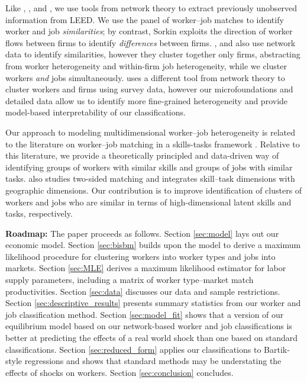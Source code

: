 \documentclass[12pt]{article}
\theoremstyle{definition}
\theoremstyle{plain}
\begin{document}
Like \citet{Sorkin2018}, \citet{Nimczik2018}, and \citet{JaroschNimczikSorkin2019}, we use tools from network theory to extract previously unobserved information from LEED. We use the panel of worker--job matches to identify worker and job \emph{similarities}; by contrast, Sorkin exploits the direction of worker flows between firms to identify \emph{differences} between firms. \citet{Nimczik2018}, and \citet{JaroschNimczikSorkin2019} also use network data to identify similarities, however they cluster together only firms, abstracting from worker heterogeneity and within-firm job heterogeneity, while we cluster workers \emph{and} jobs simultaneously. \citet{Schmutte2014} uses a different tool from network theory to cluster workers and firms using survey data, however our microfoundations and detailed data allow us to identify more fine-grained heterogeneity and provide model-based interpretability of our classifications. 

Our approach to modeling multidimensional worker--job heterogeneity is related to the literature on worker--job matching in a skills-tasks framework \citep{AutorLevyMurnane2003,AcemogluAutor2011,Autor2013,Lindenlaub2017,Tan2018,Kantenga2018}. Relative to this literature, we provide a theoretically principled and data-driven way of identifying groups of workers with similar skills and groups of jobs with similar tasks. \citet{Mansfield2019} also studies two-sided matching and integrates skill--task dimensions with geographic dimensions.  Our contribution is to improve identification of clusters of workers and jobs who are similar in terms of high-dimensional latent skills and tasks, respectively.

\textbf{Roadmap:} The paper proceeds as follows.  Section \ref{sec:model} lays out our economic model. Section \ref{sec:bisbm} builds upon the model to derive a maximum likelihood procedure for clustering workers into worker types and jobs into markets. Section \ref{sec:MLE} derives a maximum likelihood estimator for labor supply parameters, including a matrix of worker type--market match productivities. Section \ref{sec:data} discusses our data and sample restrictions. Section \ref{sec:descriptive_results} presents summary statistics from our worker and job classification method. Section \ref{sec:model_fit} shows that a version of our equilibrium model based on our network-based worker and job classifications is better at predicting the effects of a real world shock than one based on standard classifications. Section \ref{sec:reduced_form} applies our classifications to Bartik-style regressions and shows that standard methods may be understating the effects of shocks on workers. Section \ref{sec:conclusion} concludes.
\end{document}
